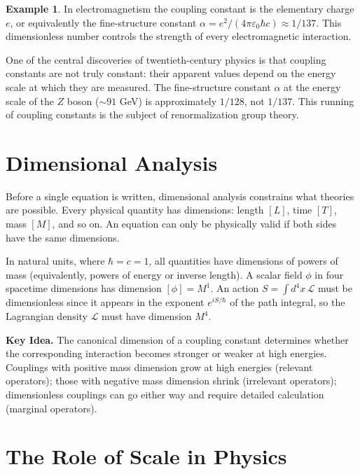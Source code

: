 \documentclass[12pt,a4paper,oneside]{book}
\theoremstyle{definition}
\newtheorem{example}{Example}[chapter]
\theoremstyle{plain}
\theoremstyle{remark}
\newenvironment{keyidea}{%
  \begin{mdframed}[linecolor=black!40,backgroundcolor=black!4,
    leftmargin=0pt,rightmargin=0pt,innerleftmargin=10pt,
    innerrightmargin=10pt,innertopmargin=8pt,innerbottommargin=8pt]
  \noindent\textbf{Key Idea.}\space}{%
  \end{mdframed}}
\begin{document}
\begin{example}
In electromagnetism the coupling constant is the elementary charge $e$, or
equivalently the fine-structure constant $\alpha = e^2/(4\pi\varepsilon_0\hbar c)
\approx 1/137$. This dimensionless number controls the strength of every
electromagnetic interaction.
\end{example}

One of the central discoveries of twentieth-century physics is that coupling
constants are not truly constant: their apparent values depend on the energy
scale at which they are measured. The fine-structure constant $\alpha$ at the
energy scale of the $Z$ boson ($\sim 91$ GeV) is approximately $1/128$, not
$1/137$. This running of coupling constants is the subject of renormalization
group theory.

\section{Dimensional Analysis}

Before a single equation is written, dimensional analysis constrains what
theories are possible. Every physical quantity has dimensions: length $[L]$,
time $[T]$, mass $[M]$, and so on. An equation can only be physically valid
if both sides have the same dimensions.

In natural units, where $\hbar = c = 1$, all quantities have dimensions of
powers of mass (equivalently, powers of energy or inverse length). A scalar
field $\phi$ in four spacetime dimensions has dimension $[\phi] = M^1$. An
action $S = \int d^4x\,\mathcal{L}$ must be dimensionless since it appears in
the exponent $e^{iS/\hbar}$ of the path integral, so the Lagrangian density
$\mathcal{L}$ must have dimension $M^4$.

\begin{keyidea}
The canonical dimension of a coupling constant determines whether the
corresponding interaction becomes stronger or weaker at high energies. Couplings
with positive mass dimension grow at high energies (relevant operators); those
with negative mass dimension shrink (irrelevant operators); dimensionless
couplings can go either way and require detailed calculation (marginal operators).
\end{keyidea}

\section{The Role of Scale in Physics}
\end{document}
